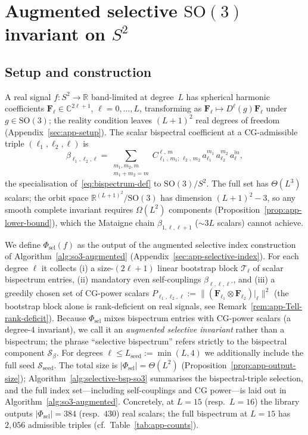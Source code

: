 \documentclass{article}
\theoremstyle{definition}
\theoremstyle{remark}
\newcommand{\R}{\mathbb{R}}
\newcommand{\C}{\mathbb{C}}
\newcommand{\SO}{\mathrm{SO}}
\newcommand{\CG}[6]{C^{#5,\,#6}_{#1,\,#2;\,#3,\,#4}}
\newcommand{\conj}[1]{\overline{#1}}
\theoremstyle{definition}
\begin{document}
\section{Augmented selective $\SO(3)$ invariant on $S^2$}
\label{sec:so3-selective}

\subsection{Setup and construction}

A real signal $f : S^2 \to \R$ band-limited at degree~$L$ has
spherical harmonic coefficients
$\mathbf{F}_\ell \in \C^{2\ell+1}$, $\ell = 0,\dots,L$, transforming
as $\mathbf{F}_\ell \mapsto D^\ell(g)\mathbf{F}_\ell$ under
$g\in\SO(3)$; the reality condition leaves $(L{+}1)^2$ real degrees
of freedom (Appendix~\ref{sec:app-setup}). The scalar bispectral
coefficient at a CG-admissible triple $(\ell_1,\ell_2,\ell)$ is
\begin{equation}\label{eq:s6-bispectrum}
  \beta_{\ell_1,\ell_2,\ell}
  = \!\!\!\sum_{\substack{m_1,m_2,m\\ m_1+m_2=m}}\!\!\!
    \CG{\ell_1}{m_1}{\ell_2}{m_2}{\ell}{m}\,
    a_{\ell_1}^{m_1}\,a_{\ell_2}^{m_2}\,\conj{a_\ell^m},
\end{equation}
the specialisation of~\eqref{eq:bispectrum-def} to $\SO(3)/S^2$.
The full set has $\Theta(L^3)$ scalars; the orbit space
$\R^{(L+1)^2}/\SO(3)$ has dimension $(L{+}1)^2 - 3$, so any smooth
complete invariant requires $\Omega(L^2)$ components
(Proposition~\ref{prop:app-lower-bound}), which the Mataigne chain
$\beta_{1,\ell,\ell+1}$ ($\sim 3L$ scalars) cannot achieve.

We define $\Phi_{\mathrm{sel}}(f)$ as the output of the augmented
selective index construction of Algorithm~\ref{alg:so3-augmented}
(Appendix~\ref{sec:app-selective-index}). For each degree $\ell$
it collects (i) a size-$(2\ell{+}1)$ linear bootstrap block
$\mathcal{T}_\ell$ of scalar bispectrum entries, (ii) mandatory
even self-couplings $\beta_{\ell,\ell,\ell'}$, and (iii) a greedily
chosen set of CG-power scalars
$P_{\ell_1,\ell_2,\ell} := \lVert(\mathbf{F}_{\ell_1}\otimes
\mathbf{F}_{\ell_2})|_\ell\rVert^2$ (the bootstrap block alone is
rank-deficient on real signals, see
Remark~\ref{rem:app-Tell-rank-deficit}). Because
$\Phi_{\mathrm{sel}}$ mixes bispectrum entries with CG-power
scalars (a degree-$4$ invariant), we call it an \emph{augmented
selective invariant} rather than a bispectrum; the phrase
``selective bispectrum'' refers strictly to the bispectral
component $\mathcal{S}_\beta$. For degrees
$\ell\le L_{\mathrm{seed}}:=\min(L,4)$ we additionally include the
full seed $\mathcal{S}_{\mathrm{seed}}$. The total size is
$|\Phi_{\mathrm{sel}}| = \Theta(L^2)$
(Proposition~\ref{prop:app-output-size}); Algorithm~\ref{alg:selective-bsp-so3}
summarises the bispectral-triple selection, and the full index
set---including self-couplings and CG power---is laid out in
Algorithm~\ref{alg:so3-augmented}. Concretely, at $L=15$ (resp.\
$L=16$) the library outputs $|\Phi_{\mathrm{sel}}| = 384$ (resp.\
$430$) real scalars; the full bispectrum at $L=15$ has $2{,}056$
admissible triples (cf.~Table~\ref{tab:app-counts}).
\end{document}
